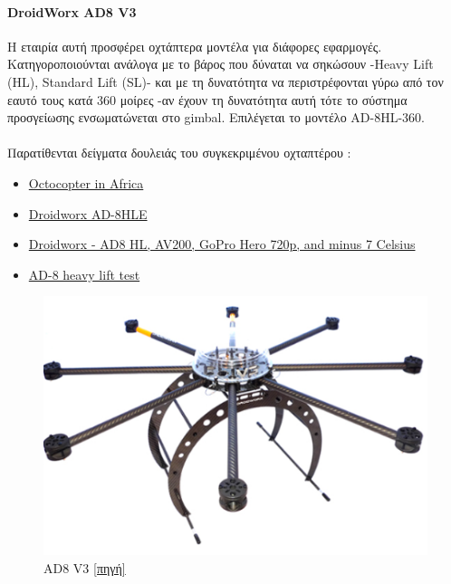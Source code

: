 \documentclass[a4paper, 12pt, twoside]{report}
\begin{document}
{{{{{{			\paragraph{DroidWorx AD8 V3}{Η εταιρία αυτή προσφέρει οχτάπτερα μοντέλα για διάφορες εφαρμογές. Κατηγοροποιούνται ανάλογα με το βάρος που δύναται να σηκώσουν -Heavy Lift (HL), Standard Lift (SL)- και με τη δυνατότητα να περιστρέφονται γύρω από τον εαυτό τους κατά 360 μοίρες -αν έχουν τη δυνατότητα αυτή τότε το σύστημα προσγείωσης ενσωματώνεται στο gimbal. Επιλέγεται το μοντέλο AD-8HL-360.
			}
			\paragraph{}{Παρατίθενται δείγματα δουλειάς του συγκεκριμένου οχταπτέρου :
				\begin{itemize}
					\item \href{https://vimeo.com/27054891}{Octocopter in Africa}
					\item \href{https://vimeo.com/28211842}{Droidworx AD-8HLE}
					\item \href{http://www.youtube.com/watch?v=VATvkc4gc0Q}{Droidworx - AD8 HL, AV200, GoPro Hero 720p, and minus 7 Celsius}
					\item \href{http://www.youtube.com/watch?v=Q0IXjN4ckLY}{AD-8 heavy lift test}
				\end{itemize}
			}
			\begin{figure}[hp]
					\centering
					\includegraphics[scale=0.50]{DroidWorx_AD8.png}
					\caption{AD8 V3 \href{http://www.proairshop.com/media/1623/DW-AD8-HL-EXT.PNG}{[πηγή]}}
					\label{φωτ:AD8 V3}
			\end{figure}
			
}}}}}}
\end{document}
